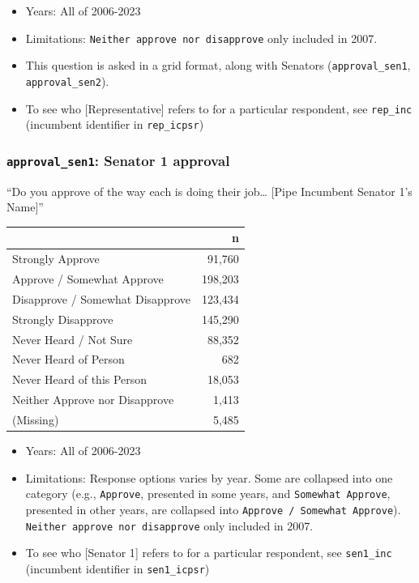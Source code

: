 \documentclass[10pt,article,oneside]{memoir}
\theoremstyle{definition}
\begin{document}
\begin{itemize}
\tightlist
\item
  Years: All of 2006-2023
\item
  Limitations: \texttt{Neither\ approve\ nor\ disapprove} only included
  in 2007.
\item
  This question is asked in a grid format, along with Senators
  (\texttt{approval\_sen1}, \texttt{approval\_sen2}).
\item
  To see who {[}Representative{]} refers to for a particular respondent,
  see \texttt{rep\_inc} (incumbent identifier in \texttt{rep\_icpsr})
\end{itemize}

\subsubsection{\texorpdfstring{\texttt{approval\_sen1}: Senator 1
approval}{approval\_sen1: Senator 1 approval}}\label{approval_sen1-senator-1-approval}

``Do you approve of the way each is doing their job\ldots{} {[}Pipe
Incumbent Senator 1's Name{]}''

\begin{table}[H]
\centering
\begin{tabular}[t]{lr}
\toprule
 & n\\
\midrule
Strongly Approve & 91,760\\
Approve / Somewhat Approve & 198,203\\
Disapprove / Somewhat Disapprove & 123,434\\
Strongly Disapprove & 145,290\\
Never Heard / Not Sure & 88,352\\
Never Heard of Person & 682\\
Never Heard of this Person & 18,053\\
Neither Approve nor Disapprove & 1,413\\
(Missing) & 5,485\\
\bottomrule
\end{tabular}
\end{table}

\begin{itemize}
\tightlist
\item
  Years: All of 2006-2023
\item
  Limitations: Response options varies by year. Some are collapsed into
  one category (e.g., \texttt{Approve}, presented in some years, and
  \texttt{Somewhat\ Approve}, presented in other years, are collapsed
  into \texttt{Approve\ /\ Somewhat\ Approve}).
  \texttt{Neither\ approve\ nor\ disapprove} only included in 2007.
\item
  To see who {[}Senator 1{]} refers to for a particular respondent, see
  \texttt{sen1\_inc} (incumbent identifier in \texttt{sen1\_icpsr})
\end{itemize}
\end{document}
